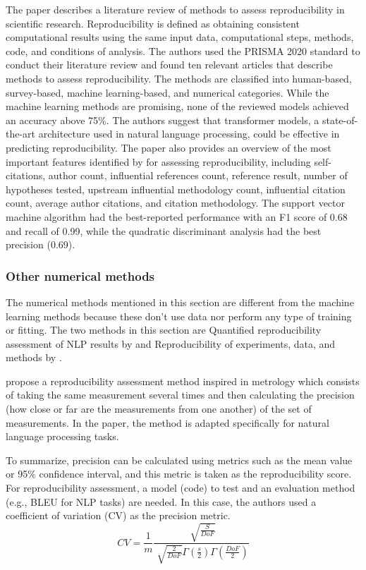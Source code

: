 \documentclass[12pt, a4paper, twocolumn]{article}
\begin{document}
			The paper describes a literature review of methods to assess reproducibility in scientific research. Reproducibility is defined as obtaining consistent computational results using the same input data, computational steps, methods, code, and conditions of analysis. The authors used the PRISMA 2020 standard to conduct their literature review and found ten relevant articles that describe methods to assess reproducibility. The methods are classified into human-based, survey-based, machine learning-based, and numerical categories. While the machine learning methods are promising, none of the reviewed models achieved an accuracy above 75\%. The authors suggest that transformer models, a state-of-the-art architecture used in natural language processing, could be effective in predicting reproducibility. The paper also provides an overview of the most important features identified by \citet{wu2021predicting} for assessing reproducibility, including self-citations, author count, influential references count, reference result, number of hypotheses tested, upstream influential methodology count, influential citation count, average author citations, and citation methodology. The support vector machine algorithm had the best-reported performance with an F1 score of 0.68 and recall of 0.99, while the quadratic discriminant analysis had the best precision (0.69).

		\subsubsection{Other numerical methods} \label{sec:num_methods}

			 The numerical methods mentioned in this section are different from the machine learning methods because these don’t use data nor perform any type of training or fitting. The two methods in this section are Quantified reproducibility assessment of NLP results by \citet{belz2022quantified} and Reproducibility of experiments, data, and methods by \citet{gundersen2018state}. 

			\citet{belz2022quantified} propose a reproducibility assessment method inspired in metrology which consists of taking the same measurement several times and then calculating the precision (how close or far are the measurements from one another) of the set of measurements. In the paper, the method is adapted specifically for natural language processing tasks.

			To summarize, precision can be calculated using metrics such as the mean value or 95\% confidence interval, and this metric is taken as the reproducibility score. For reproducibility assessment, a model (code) to test and an evaluation method (e.g., BLEU for NLP tasks) are needed. In this case, the authors used a coefficient of variation (CV) as the precision metric.
			\begin{equation}\label{cv}
				CV = \frac{1}{m} \frac{\sqrt[]{\frac{S}{DoF}}}{\sqrt[]{\frac{2}{DoF}} \Gamma(\frac{s}{2})  \Gamma(\frac{DoF}{2}) }
			\end{equation}
\end{document}
